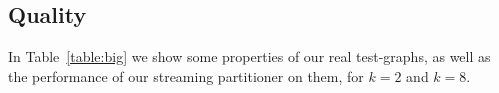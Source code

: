 
\subsection{Quality}
In Table~\ref{table:big} we show some properties of our real test-graphs, as well as the performance of our streaming partitioner on them, for $k=2$ and $k=8$.


